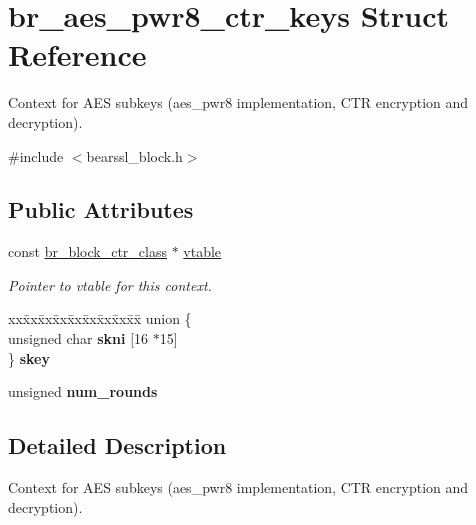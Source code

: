 \hypertarget{structbr__aes__pwr8__ctr__keys}{}\section{br\+\_\+aes\+\_\+pwr8\+\_\+ctr\+\_\+keys Struct Reference}
\label{structbr__aes__pwr8__ctr__keys}


Context for A\+ES subkeys ({\ttfamily aes\+\_\+pwr8} implementation, C\+TR encryption and decryption).  




{\ttfamily \#include $<$bearssl\+\_\+block.\+h$>$}

\subsection*{Public Attributes}
\begin{DoxyCompactItemize}
\item 
\mbox{\label{structbr__aes__pwr8__ctr__keys_a4301bfe6690c67ca08b0b138dd954240}} 
const \hyperlink{bearssl__block_8h_a8934ac58af503220bfb6e6cbc2cfb209}{br\+\_\+block\+\_\+ctr\+\_\+class} $\ast$ \hyperlink{structbr__aes__pwr8__ctr__keys_a4301bfe6690c67ca08b0b138dd954240}{vtable}
\begin{DoxyCompactList}\small\item\em Pointer to vtable for this context. \end{DoxyCompactList}\item 
\mbox{\label{structbr__aes__pwr8__ctr__keys_a64899fb355fcfe5388b535706c23259a}} 
\begin{tabbing}
xx\=xx\=xx\=xx\=xx\=xx\=xx\=xx\=xx\=\kill
union \{\\
\>unsigned char {\bfseries skni} \mbox{[}16 $\ast$15\mbox{]}\\
\} {\bfseries skey}\\

\end{tabbing}\item 
\mbox{\label{structbr__aes__pwr8__ctr__keys_afcc78b37ba542282fb8ef60d73f66804}} 
unsigned {\bfseries num\+\_\+rounds}
\end{DoxyCompactItemize}


\subsection{Detailed Description}
Context for A\+ES subkeys ({\ttfamily aes\+\_\+pwr8} implementation, C\+TR encryption and decryption). 

